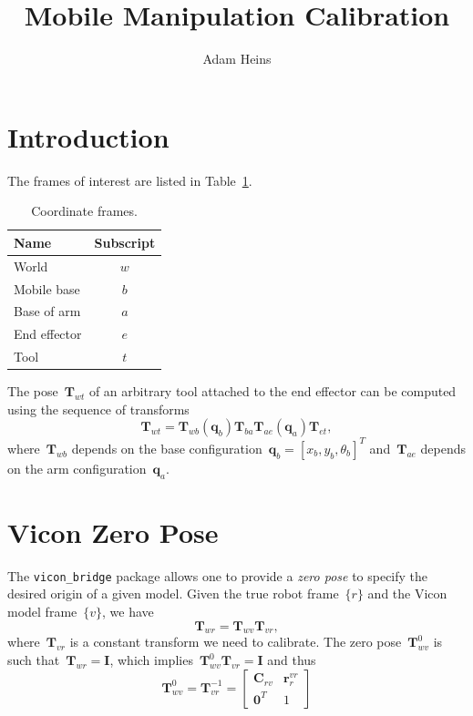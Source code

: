 \documentclass{article}
\title{Mobile Manipulation Calibration}
\author{Adam Heins}
\begin{document}
\maketitle

\section{Introduction}

The frames of interest are listed in Table~\ref{tab:frames}.

\begin{table}[h]
  \caption{Coordinate frames.}
  \centering
    \begin{tabular}{l c}
      \toprule
      Name & Subscript \\
      \midrule
      World        & $w$ \\
      Mobile base  & $b$ \\
      Base of arm  & $a$ \\
      End effector & $e$  \\
      Tool         & $t$ \\
      \bottomrule
    \end{tabular}
  \label{tab:frames}
\end{table}

The pose~$\bm{T}_{wt}$ of an arbitrary tool attached to the end effector can be
computed using the sequence of transforms
\begin{equation}\label{eq:kinematic_chain}
  \bm{T}_{wt} = \bm{T}_{wb}(\bm{q}_b)\bm{T}_{ba}\bm{T}_{ae}(\bm{q}_a)\bm{T}_{et},
\end{equation}
where~$\bm{T}_{wb}$ depends on the base
configuration~$\bm{q}_b=[x_b,y_b,\theta_b]^T$ and~$\bm{T}_{ae}$ depends on the
arm configuration~$\bm{q}_a$.

\section{Vicon Zero Pose}

The \texttt{vicon\_bridge} package allows one to provide a \emph{zero pose} to
specify the desired origin of a given model. Given the true robot frame~$\{r\}$
and the Vicon model frame~$\{v\}$, we have
\begin{equation*}
  \bm{T}_{wr} = \bm{T}_{wv}\bm{T}_{vr},
\end{equation*}
where~$\bm{T}_{vr}$ is a constant transform we need to calibrate. The zero
pose~$\bm{T}_{wv}^0$ is such that~$\bm{T}_{wr}=\bm{I}$, which
implies~$\bm{T}_{wv}^0\bm{T}_{vr}=\bm{I}$ and
thus
\begin{equation*}
  \bm{T}_{wv}^0 = \bm{T}_{vr}^{-1} = \begin{bmatrix} \bm{C}_{rv} & \bm{r}^{vr}_r \\ \bm{0}^T & 1 \end{bmatrix}
\end{equation*}
\end{document}
